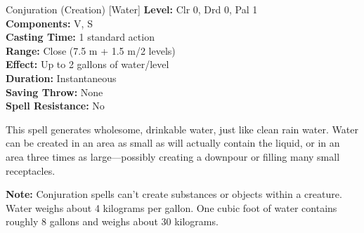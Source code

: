 {Conjuration (Creation) [Water]}
{
	\textbf{Level:}
	Clr 0, Drd 0, Pal 1\\
	\textbf{Components:}
	V, S\\
	\textbf{Casting Time:}
	1 standard action\\
	\textbf{Range:}
	Close (7.5 m + 1.5 m/2 levels)\\
	\textbf{Effect:}
	Up to 2 gallons of water/level\\
	\textbf{Duration:}
	Instantaneous\\
	\textbf{Saving Throw:}
	None\\
	\textbf{Spell Resistance:}
	No\\
}
{
	This spell generates wholesome, drinkable water, just like clean rain water. Water can be created in an area as small as will actually contain the liquid, or in an area three times as large---possibly creating a downpour or filling many small receptacles.

	\textbf{Note:} Conjuration spells can't create substances or objects within a creature. Water weighs about 4 kilograms per gallon. One cubic foot of water contains roughly 8 gallons and weighs about 30 kilograms.

}
